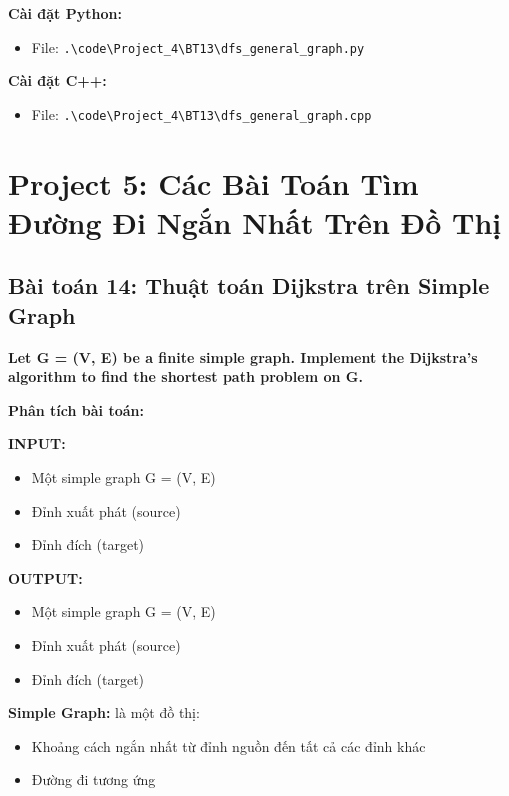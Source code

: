 \documentclass[12pt,a4paper]{article}
\begin{document}
\textbf{Cài đặt Python:}
\begin{itemize}[label=\textbullet]
   \item File: \texttt{.\textbackslash code\textbackslash Project\_4\textbackslash BT13\textbackslash dfs\_general\_graph.py}
\end{itemize}

\textbf{Cài đặt C++:}
\begin{itemize}[label=\textbullet]
   \item File: \texttt{.\textbackslash code\textbackslash Project\_4\textbackslash BT13\textbackslash dfs\_general\_graph.cpp}
\end{itemize}



\newpage


\section{Project 5: Các Bài Toán Tìm Đường Đi Ngắn Nhất Trên Đồ Thị}

\subsection{Bài toán 14: Thuật toán Dijkstra trên Simple Graph}

\begin{problembox}
    \textbf{Let G = (V, E) be a finite simple graph. Implement the Dijkstra's algorithm to find the shortest path problem on G.}
\end{problembox}

\textbf{Phân tích bài toán:}

\textbf{INPUT:}
\begin{itemize}[label=\textbullet]
    \item Một simple graph G = (V, E)
    \item Đỉnh xuất phát (source)
    \item Đỉnh đích (target)
\end{itemize}

\textbf{OUTPUT:}
\begin{itemize}[label=\textbullet]
    \item Một simple graph G = (V, E)
    \item Đỉnh xuất phát (source)
    \item Đỉnh đích (target)
\end{itemize}

\textbf{Simple Graph:} là một đồ thị:
\begin{itemize}[label=\textbullet]
    \item Khoảng cách ngắn nhất từ đỉnh nguồn đến tất cả các đỉnh khác
    \item Đường đi tương ứng
\end{itemize}
\end{document}
